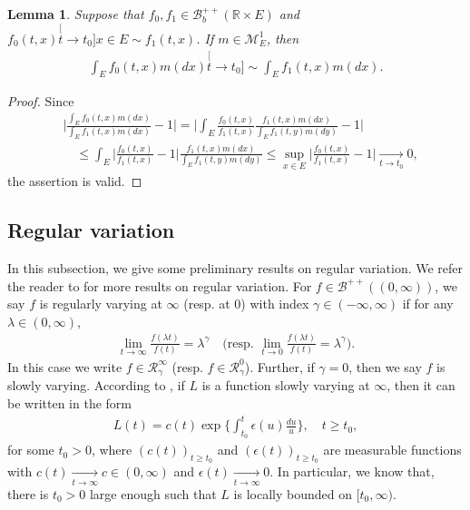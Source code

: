 \documentclass[UTF8]{pkuthss}
\theoremstyle{plain}
\newtheorem{lem}[thm]{Lemma}
\theoremstyle{definition}
\numberwithin{equation}{section}
\begin{document}
\begin{lem} \label{lem: asymptotic equivalent of integration}
	Suppose that $f_0,f_1\in \mathscr B^{++}_b({\mathbb R \times E})$ and $f_0(t,x)\stackrel[t\to t_0]{x\in E}{\sim}f_1(t,x)$.
	If $m \in \mathcal M^1_E$, then
\begin{align}
	\int_E f_0(t,x)m(dx)
	\stackrel[t\to t_0]{}{\sim}
	\int_E f_1(t,x)m(dx).
\end{align}
\end{lem}
\begin{proof}
	Since
\begin{align}
	&\Big| \frac{	\int_E f_0(t,x)m(dx) }{ 	\int_E f_1(t,x)m(dx)  } - 1 \Big|
	= \Big| \int_E \frac{f_0(t,x)}{f_1(t,x)} \frac{f_1(t,x)m(dx)}{	\int_E f_1(t,y)m(dy)  } - 1\Big|
	\\&\quad \leq \int_E \Big|  \frac{f_0(t,x)}{f_1(t,x)} - 1 \Big| \frac{f_1(t,x)m(dx)}{	\int_E f_1(t,y)m(dy)  }
	\leq \sup_{x\in E} \Big|  \frac{f_0(t,x)}{f_1(t,x)} - 1 \Big|
	\xrightarrow[t\to t_0]{} 0,
\end{align}
	the assertion is valid.
\end{proof}

\subsection{Regular variation}
\label{sec: Regularly variation}
	In this subsection, we give some preliminary results on regular variation.
	We refer the reader to \cite{BinghamGoldieTeugels1989Regular} for more results on  regular variation.
	For $f\in \mathscr B^{++}((0,\infty))$, we say $f$ is regularly varying at $\infty$ (resp. at $0$) with index $\gamma \in (-\infty,\infty)$ if for any $\lambda \in (0,\infty)$,
\begin{align}
	\lim_{t\to\infty}\frac{f(\lambda t)}{f(t)}
	= \lambda^\gamma
	\quad \Big(\text{resp. } \lim_{t\to 0}\frac{f(\lambda t)}{f(t)}
	= \lambda^\gamma\Big).
\end{align}
	In this case we write  $f\in \mathcal R^\infty_\gamma$ (resp. $f\in \mathcal R^0_\gamma$).
	Further, if $\gamma = 0$, then we say $f$ is slowly varying.
	According to \cite[Theorem 1.3.1]{BinghamGoldieTeugels1989Regular},
	if $L$ is a function slowly varying at $\infty$, then it can be written in the form
\begin{align}
	L(t)
	= c(t) \exp\Big\{\int_{t_0}^t \epsilon(u) \frac{du}{u}\Big\},\quad t\geq t_0,
\end{align}
	for some $t_0>0$, where $(c(t))_{t\geq t_0}$ and $(\epsilon(t))_{t\geq t_0}$ are measurable functions with $c(t) \xrightarrow[t\to \infty]{} c \in (0,\infty)$ and $\epsilon(t) \xrightarrow[t\to \infty]{} 0$.
	In particular, we know that, there is $t_0 > 0$ large enough such that $L$ is locally bounded on $[t_0,\infty)$.
\end{document}
